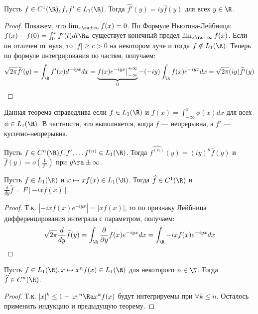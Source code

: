 \begin{theorem}
    Пусть \(f \in C^1(\R), f, f' \in L_1(\R)\). Тогда \(\widehat{f'}(y) = iy\widehat{f}(y)\) для всех \(y \in \R\).
\end{theorem}
\begin{proof}
    Покажем, что \(\lim_{x \ra \pm\infty} f(x) = 0\). По Формуле Ньютона-Лейбница: \(f(x) - f(0) = \int_0^x f'(t)dt \Ra\) существует конечный предел \(\lim_{x \ra \pm\infty} f(x)\). Если он отличен от нуля, то \(|f| \ge c > 0\) на некотором луче и тогда \(f \notin L_1(\R)\). Теперь по формуле интегрирования по частям, получаем:
    \[\sqrt{2\pi}\widehat{f'}(y) = \int_\R f'(x)d^{-iyx}dx = \underbrace{f(x)e^{-iyx}\big|_{-\infty}^{+\infty}}_0 - (-iy)\int_\R f(x) e^{-iyx}dx = \sqrt{2\pi} (iy)\widehat{f'}(y)\]
\end{proof}

\begin{note}
    Данная теорема справедлива если \(f \in L_1(\R)\) и \(f(x) = \int_{-\infty}^x \phi(x)dx\) для всех \(\phi \in L_1(\R)\). В частности, это выполняется, когда \(f\) --- непрерывна, а \(f'\) --- кусочно-непрерывна.
\end{note}

\begin{corollary}
    Пусть \(f \in C^n(\R) f, f', \dots f^{(n)} \in L_1(\R)\). Тогда \(\widehat{f^{(n)}}(y) = (iy)^n\widehat{f}(y)\) и \(\widehat{f}(y) = o\left( \frac{1}{y^n} \right)\) при \(y \ra \pm\infty\)
\end{corollary}

\begin{theorem}
    Пусть \(f \in L_1(\R)\) и \(x \mapsto xf(x) \in L_1(\R)\). Тогда \(\widehat{f} \in C^1(\R)\) и \(\frac{d}{dy}\widehat{f} = F[-ixf(x)]\).
\end{theorem}
\begin{proof}
    Т.к. \(|-ix f(x)e^{-iyx}| = |xf(x)|\), то по признаку Лейбница дифференцирования интеграла с параметром, получаем:
    \[\sqrt{2\pi}\frac{d}{dy}\widehat{f}(y) = \int_\R \frac{\partial}{\partial y}f(x)e^{-iyx}dx = \int_\R -ixf(x)e^{-iyx}dx\]
\end{proof}

\begin{corollary}
    Пусть \(f \in L_1(\R), x \mapsto x^nf(x) \in L_1(\R)\) для некоторого \(n \in \N\). Тогда \(\widehat{f} \in C^n(\R)\).
\end{corollary}
\begin{proof}
    Т.к. \(|x|^k \le 1 + |x|^n \Ra x^kf(x)\) будут интегрируемы при \(\forall k \le n\). Осталось применить индукцию и предыдущую теорему.
\end{proof}

